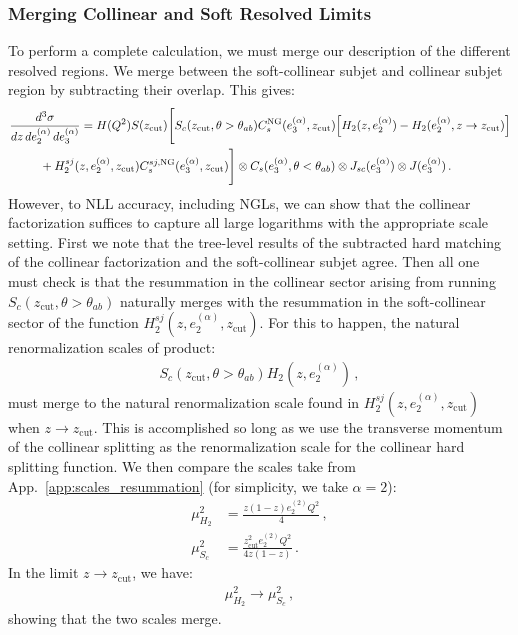 \documentclass[a4paper,11pt]{article}
\newcommand{\ecf}[2]{e_{#1}^{(#2)}}
\def\zcut{z_{\text{cut}}}
\DeclareRobustCommand{\App}[1]{App.~\ref{#1}}
\begin{document}
\subsubsection{Merging Collinear and Soft Resolved Limits}\label{sec:fact_merge}

To perform a complete calculation, we must merge our description of the different resolved regions.
We merge between the soft-collinear subjet and collinear subjet region by subtracting their overlap. This gives:
\begin{align}
\frac{d^3\sigma}{dz\,d\ecf{2}{\alpha} \, d\ecf{3}{\alpha}}&= H(Q^2) S(\zcut) \Bigg[S_c(\zcut,\theta>\theta_{ab})C_s^{\text{NG}}(\ecf{3}{\alpha},\zcut)\Big[ H_2(z,\ecf{2}{\alpha})- H_2(\ecf{2}{\alpha},z\to \zcut)\Big]\nonumber\\
&
\hspace{-1.2cm}
+ H_2^{sj}(z,\ecf{2}{\alpha},\zcut)C_s^{sj,\text{NG}}(\ecf{3}{\alpha},\zcut)  \Bigg]\otimes C_s(\ecf{3}{\alpha},\theta<\theta_{ab}) \otimes J_{sc}(\ecf{3}{\alpha})\otimes J(\ecf{3}{\alpha}) \,.
\end{align}
However, to NLL accuracy, including NGLs, we can show that the collinear factorization suffices to capture all large logarithms with the appropriate scale setting. First we note that the tree-level results of the subtracted hard matching of the collinear factorization and the soft-collinear subjet agree. Then all one must check is that the resummation in the collinear sector arising from running $S_c(\zcut,\theta>\theta_{ab})$ naturally merges with the resummation in the soft-collinear sector of the function $H_2^{sj}(z,\ecf{2}{\alpha},\zcut)$. For this to happen, the natural renormalization scales of product:
\begin{align}
S_c(\zcut,\theta>\theta_{ab}) H_2(z,\ecf{2}{\alpha})\,,
\end{align} 
must merge to the natural renormalization scale found in $H_2^{sj}(z,\ecf{2}{\alpha},\zcut)$ when $z\rightarrow \zcut$. This is accomplished so long as we use the transverse momentum of the collinear splitting as the renormalization scale for the collinear hard splitting function. We then compare the scales take from \App{app:scales_resummation} (for simplicity, we take $\alpha =2$):
\begin{align}
\mu_{H_2}^2&=\frac{z(1-z)\ecf{2}{2}Q^2}{4}\,,\\
\mu_{S_c}^2&=\frac{z_{\text{cut}}^2\ecf{2}{2}Q^2}{4z(1-z)}\,.
\end{align}
In the limit $z\rightarrow z_{\text{cut}}$, we have:
\begin{align}
\mu_{H_2}^2\rightarrow \mu_{S_c}^2\,,
\end{align}
showing that the two scales merge.
\end{document}
